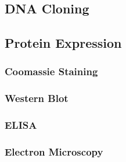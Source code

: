 \subsection{DNA Cloning}
\subsection{Protein Expression}
\subsubsection{Coomassie Staining}
\subsubsection{Western Blot}
\subsubsection{ELISA}
\subsubsection{Electron Microscopy}